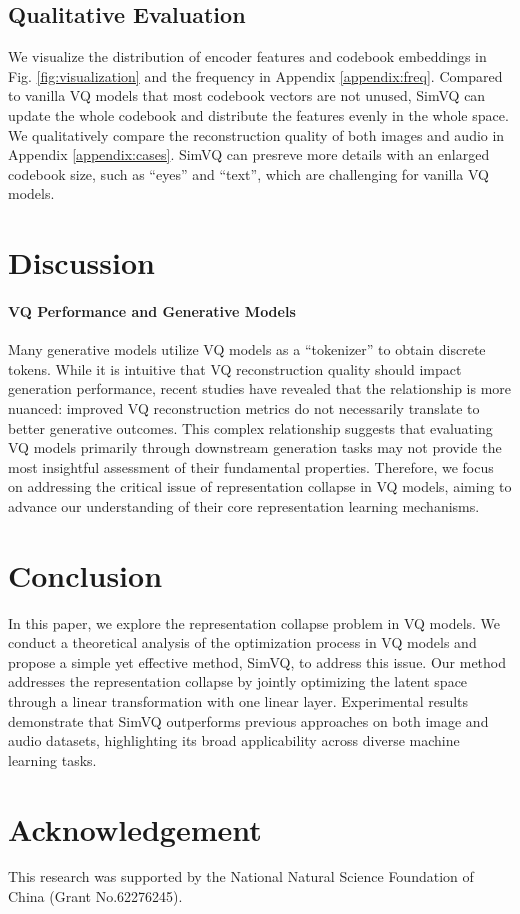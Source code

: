 \subsection{Qualitative Evaluation}
We visualize the distribution of encoder features and codebook embeddings in Fig. \ref{fig:visualization} and the frequency in Appendix \ref{appendix:freq}. Compared to vanilla VQ models that most codebook vectors are not unused, SimVQ can update the whole codebook and distribute the features evenly in the whole space.
We qualitatively compare the reconstruction quality of both images and audio in Appendix \ref{appendix:cases}. SimVQ can presreve more details with an enlarged codebook size, such as ``eyes'' and ``text'', which are challenging for vanilla VQ models. 






\section{Discussion}


\paragraph{VQ Performance and Generative Models}


Many generative models \cite{Rombach_2022_CVPR,yu2022scaling,sun2024autoregressive,team2024chameleon} utilize VQ models as a ``tokenizer'' to obtain discrete tokens. While it is intuitive that VQ reconstruction quality should impact generation performance, recent studies \cite{zhu2024stabilize,yu2024language} have revealed that the relationship is more nuanced: improved VQ reconstruction metrics do not necessarily translate to better generative outcomes. This complex relationship suggests that evaluating VQ models primarily through downstream generation tasks may not provide the most insightful assessment of their fundamental properties. Therefore, we focus on addressing the critical issue of representation collapse in VQ models, aiming to advance our understanding of their core representation learning mechanisms.

\section{Conclusion}
In this paper, we explore the representation collapse problem in VQ models. We conduct a theoretical analysis of the optimization process in VQ models and propose a simple yet effective method, SimVQ, to address this issue. Our method addresses the representation collapse by jointly optimizing the latent space through a linear transformation with one linear layer. Experimental results demonstrate that SimVQ outperforms previous approaches on both image and audio datasets, highlighting its broad applicability across diverse machine learning tasks.


\section*{Acknowledgement}

This research was supported by the National Natural Science Foundation of China (Grant No.62276245).